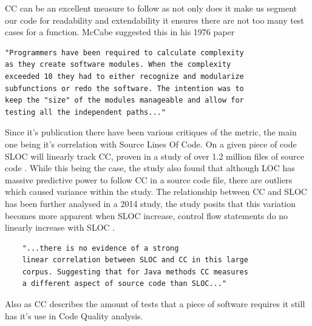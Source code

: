 CC can be an excellent measure to follow as not only does it make us segment our code for readability and extendability it ensures there are not too many test cases for a function.
\newline
McCabe suggested this in his 1976 paper \cite{cycloMaticComplexity}
\begin{verbatim}
"Programmers have been required to calculate complexity 
as they create software modules. When the complexity 
exceeded 10 they had to either recognize and modularize 
subfunctions or redo the software. The intention was to 
keep the "size" of the modules manageable and allow for 
testing all the independent paths..."
\end{verbatim}
Since it's publication there have been various critiques of the metric, the main one being it's correlation with
Source Lines Of Code. On a given piece of code SLOC will linearly track CC, proven in a study of over 1.2 million files of source code \cite{graylin2009cyclomatic}.
While this being the case, the study also found that although LOC has massive predictive power to follow CC in a source code file, there are outliers
which caused variance within the study.
The relationship between CC and SLOC has been further analysed in a 2014 study, the study posits that this variation becomes more apparent
when SLOC increase, control flow statements do no linearly increase with SLOC \cite{CCANDSLOC}.
\begin{verbatim}
    "...there is no evidence of a strong
    linear correlation between SLOC and CC in this large 
    corpus. Suggesting that for Java methods CC measures 
    a different aspect of source code than SLOC..."
    \end{verbatim}
\cite{CCANDSLOC}
Also as CC describes the amount of tests that a piece of software requires it still has it's use in Code Quality analysis.


